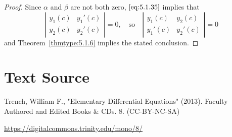 \documentclass{ximera}
\begin{document}
 
\begin{proof} Since $\alpha$ and $\beta$ are not both zero,   $\eqref{eq:5.1.35}$
implies that
$$
\left|\begin{array}{ccccccc}
y_{1}(c)&y_{1}'(c)\\y_{2}(c)& y_{2}'(c)
\end{array}\right|=0, \quad\text{so}\quad
\left|\begin{array}{cccccc}
y_{1}(c)&y_{2}(c)\\ y_{1}'(c)&y_{2}'(c)
\end{array}\right|=0
$$
and Theorem~\ref{thmtype:5.1.6} implies the stated conclusion.
\end{proof}
 
\section*{Text Source}
Trench, William F., "Elementary Differential Equations" (2013). Faculty Authored and Edited Books \& CDs. 8. (CC-BY-NC-SA)
 
\href{https://digitalcommons.trinity.edu/mono/8/}{https://digitalcommons.trinity.edu/mono/8/}
 
 
\end{document}
